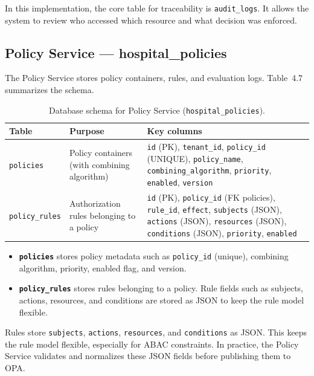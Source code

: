 In this implementation, the core table for traceability is \texttt{audit\_logs}. It allows the system to review who accessed which resource and what decision was enforced.


\subsection{Policy Service — hospital\_policies}
The Policy Service stores policy containers, rules, and evaluation logs. Table~4.7 summarizes the schema.

\begin{table}[H]
\centering
\renewcommand{\arraystretch}{1.2}
\begin{tabular}{|p{3.2cm}|p{5.6cm}|p{5.6cm}|}
\hline
\textbf{Table} & \textbf{Purpose} & \textbf{Key columns} \\
\hline
\texttt{policies} &
Policy containers (with combining algorithm) &
\texttt{id} (PK), \texttt{tenant\_id}, \texttt{policy\_id} (UNIQUE), \texttt{policy\_name}, \texttt{combining\_algorithm}, \texttt{priority}, \texttt{enabled}, \texttt{version} \\
\hline
\texttt{policy\_rules} &
Authorization rules belonging to a policy &
\texttt{id} (PK), \texttt{policy\_id} (FK \textrightarrow{} policies), \texttt{rule\_id}, \texttt{effect}, \texttt{subjects} (JSON), \texttt{actions} (JSON), \texttt{resources} (JSON), \texttt{conditions} (JSON), \texttt{priority}, \texttt{enabled} \\
\hline
\end{tabular}
\caption{Database schema for Policy Service (\texttt{hospital\_policies}).}
\label{tab:db-schema-policy-service}
\end{table}

\begin{itemize}
  \item \textbf{\texttt{policies}} stores policy metadata such as \texttt{policy\_id} (unique), combining algorithm, priority, enabled flag, and version.
  \item \textbf{\texttt{policy\_rules}} stores rules belonging to a policy. Rule fields such as subjects, actions, resources, and conditions are stored as JSON to keep the rule model flexible.
\end{itemize}
Rules store \texttt{subjects}, \texttt{actions}, \texttt{resources}, and \texttt{conditions} as JSON. This keeps the rule model flexible, especially for ABAC constraints. In practice, the Policy Service validates and normalizes these JSON fields before publishing them to OPA.
\vspace{0.5cm}

